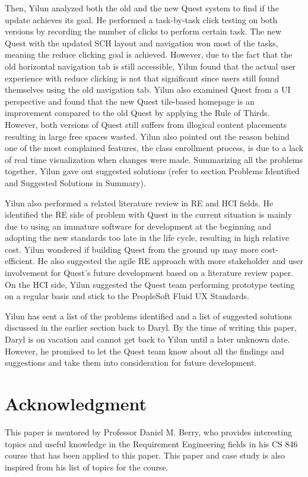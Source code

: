 \documentclass[conference]{IEEEtran}
\begin{document}
Then, Yilun analyzed both the old and the new Quest system to find if the update achieves its goal. He performed a task-by-task  click testing on both versions by recording the number of clicks to perform certain task. The new Quest with the updated SCH layout and navigation won most of the tasks, meaning the reduce clicking goal is achieved. However, due to the fact that the old horizontal navigation tab is still accessible, Yilun found that the actual user experience with reduce clicking is not that significant since users still found themselves using the old navigation tab. Yilun also examined Quest from a UI perspective and found that the new Quest tile-based homepage is an improvement compared to the old Quest by applying the Rule of Thirds. However, both versions of Quest still suffers from illogical content placements resulting in large free spaces wasted. Yilun also pointed out the reason behind one of the most complained features, the class enrollment process, is due to a lack of real time visualization when changes were made. Summarizing all the problems together, Yilun gave out suggested solutions (refer to section Problems Identified and Suggested Solutions in Summary).

Yilun also performed a related literature review in RE and HCI fields. He identified the RE side of problem with Quest in the current situation is mainly due to using an immature software for development at the beginning and adopting the new standards too late in the life cycle, resulting in high relative cost. Yilun wondered if building Quest from the ground up may more cost-efficient. He also suggested the agile RE approach with more stakeholder and user involvement for Quest's future development based on a literature review paper. On the HCI side, Yilun suggested the Quest team performing prototype testing on a regular basis and stick to the PeopleSoft Fluid UX Standards.

Yilun has sent a list of the problems identified and a list of suggested solutions discussed in the earlier section back to Daryl. By the time of writing this paper, Daryl is on vacation and cannot get back to Yilun until a later unknown date. However, he promised to let the Quest team know about all the findings and suggestions and take them into consideration for future development.

\section*{Acknowledgment}
This paper is mentored by Professor Daniel M. Berry, who provides interesting topics and useful knowledge in the Requirement Engineering fields in his CS 846 course that has been applied to this paper. This paper and case study is also inspired from his list of topics for the course.
\end{document}
